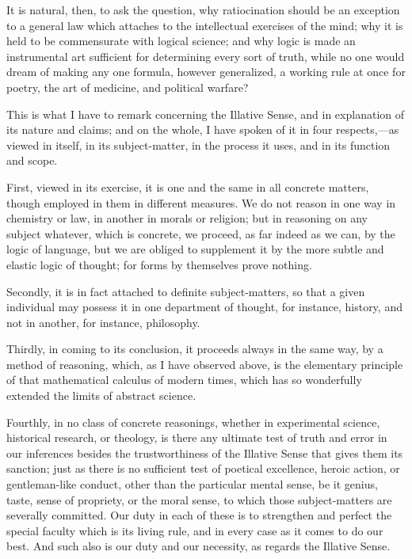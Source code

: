 It is natural, then, to ask the question, why ratiocination should
be an exception to a general law which attaches to the intellectual
exercises of the mind; why it is held to be commensurate with logical
science; and why logic is made an instrumental art sufficient for
determining every sort of truth, while no one would dream of making
any one formula, however generalized, a working rule at once for
poetry, the art of medicine, and political warfare?

This is what I have to remark concerning the Illative Sense, and in
explanation of its nature and claims; and on the whole, I have spoken
of it in four respects,—as viewed in itself, in its subject-matter,
in the process it uses, and in its function and scope.

First, viewed in its exercise, it is one and the same in all
concrete matters, though employed in them in different measures. We do
not reason in one way in chemistry or law, in another in morals
or religion; but in reasoning on any subject whatever, which is
concrete, we proceed, as far indeed as we can, by the logic of
language, but we are obliged to supplement it by the more subtle and
elastic logic of thought; for forms by themselves prove nothing.

Secondly, it is in fact attached to definite subject-matters, so
that a given individual may possess it in one department of thought,
for instance, history, and not in another, for instance, philosophy.

Thirdly, in coming to its conclusion, it proceeds always in the
same way, by a method of reasoning, which, as I have observed above,
is the elementary principle of that mathematical calculus of modern
times, which has so wonderfully extended the limits of abstract
science.

Fourthly, in no class of concrete reasonings, whether in
experimental science, historical research, or theology, is there any
ultimate test of truth and error in our inferences besides the
trustworthiness of the Illative Sense that gives them its sanction;
just as there is no sufficient test of poetical excellence, heroic
action, or gentleman-like conduct, other than the particular mental
sense, be it genius, taste, sense of propriety, or the moral sense, to
which those subject-matters are severally committed. Our duty in each
of these is to strengthen and perfect the special faculty which is its
living rule, and in every case as it comes to do our best. And such
also is our duty and our necessity, as regards the Illative Sense.

